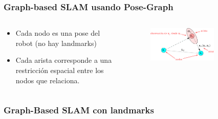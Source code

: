 \begin{frame}
    \frametitle{Graph-based SLAM usando Pose-Graph}
    
    \begin{columns}
        \begin{column}{0.5\textwidth}
            \begin{itemize}
                \item Cada nodo es una pose del robot (no hay landmarks)
                \item Cada arista corresponde a una restricción espacial entre los nodos que relaciona.
            \end{itemize}
        \end{column}
        \begin{column}{0.5\textwidth}  %
            \begin{figure}[!h]
                \includegraphics[width=0.7\textwidth]{images/factor_graph_edge_example.pdf}
            \end{figure}
        \end{column}
    \end{columns}
    
\end{frame}


\begin{frame}
    \frametitle{Graph-Based SLAM con landmarks}
    
\end{frame}


